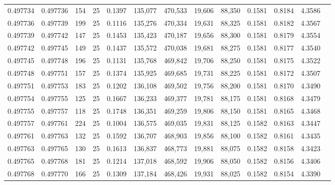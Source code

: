 \begin{tabular}{rrrrrrrrrrrrr}
0.497734 & 0.497736 & 154 &  25 &                                     0.1397 & 135,077 & 470,533 &  19,606 &  88,350 & 0.1581 & 0.8184 & 4.3586 \\
0.497736 & 0.497739 & 199 &  25 &                                     0.1116 & 135,276 & 470,334 &  19,631 &  88,325 & 0.1581 & 0.8182 & 4.3567 \\
0.497739 & 0.497742 & 147 &  25 &                                     0.1453 & 135,423 & 470,187 &  19,656 &  88,300 & 0.1581 & 0.8179 & 4.3554 \\
0.497742 & 0.497745 & 149 &  25 &                                     0.1437 & 135,572 & 470,038 &  19,681 &  88,275 & 0.1581 & 0.8177 & 4.3540 \\
0.497745 & 0.497748 & 196 &  25 &                                     0.1131 & 135,768 & 469,842 &  19,706 &  88,250 & 0.1581 & 0.8175 & 4.3522 \\
0.497748 & 0.497751 & 157 &  25 &                                     0.1374 & 135,925 & 469,685 &  19,731 &  88,225 & 0.1581 & 0.8172 & 4.3507 \\
0.497751 & 0.497753 & 183 &  25 &                                     0.1202 & 136,108 & 469,502 &  19,756 &  88,200 & 0.1581 & 0.8170 & 4.3490 \\
0.497754 & 0.497755 & 125 &  25 &                                     0.1667 & 136,233 & 469,377 &  19,781 &  88,175 & 0.1581 & 0.8168 & 4.3479 \\
0.497755 & 0.497757 & 118 &  25 &                                     0.1748 & 136,351 & 469,259 &  19,806 &  88,150 & 0.1581 & 0.8165 & 4.3468 \\
0.497757 & 0.497761 & 224 &  25 &                                     0.1004 & 136,575 & 469,035 &  19,831 &  88,125 & 0.1582 & 0.8163 & 4.3447 \\
0.497761 & 0.497763 & 132 &  25 &                                     0.1592 & 136,707 & 468,903 &  19,856 &  88,100 & 0.1582 & 0.8161 & 4.3435 \\
0.497763 & 0.497765 & 130 &  25 &                                     0.1613 & 136,837 & 468,773 &  19,881 &  88,075 & 0.1582 & 0.8158 & 4.3423 \\
0.497765 & 0.497768 & 181 &  25 &                                     0.1214 & 137,018 & 468,592 &  19,906 &  88,050 & 0.1582 & 0.8156 & 4.3406 \\
0.497768 & 0.497770 & 166 &  25 &                                     0.1309 & 137,184 & 468,426 &  19,931 &  88,025 & 0.1582 & 0.8154 & 4.3390 \\

\end{tabular}
